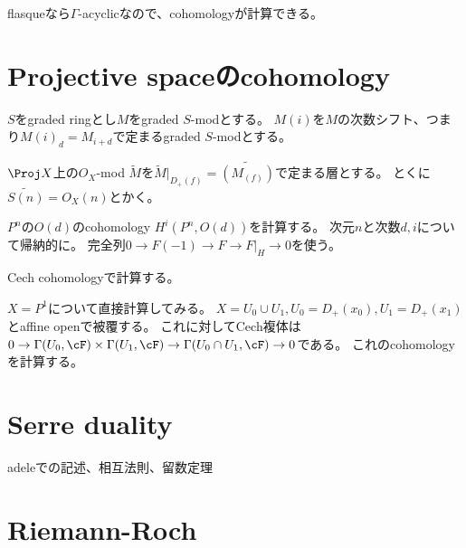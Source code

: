 \documentclass{jsarticle}
\begin{document}
flasqueなら$\Gamma$-acyclicなので、cohomologyが計算できる。

\section{Projective spaceのcohomology}
$S$をgraded ringとし$M$をgraded $S$-modとする。
$M(i)$を$M$の次数シフト、つまり$M(i)_d=M_{i+d}$で定まるgraded $S$-modとする。

$\Proj X$上の$O_X$-mod $\tilde{M}$を$\tilde{M}\vert_{D_+(f)}=\tilde{(M_{(f)})}$で定まる層とする。
とくに$\tilde{S(n)}=O_X(n)$とかく。

$P^n$の$O(d)$のcohomology $H^i(P^n, O(d))$を計算する。
次元$n$と次数$d, i$について帰納的に。
完全列$0 \to F(-1) \to F \to F\vert_H \to 0$を使う。

Cech cohomologyで計算する。

$X=P^1$について直接計算してみる。
$X=U_0 \cup U_1, U_0=D_+(x_0), U_1=D_+(x_1)$とaffine openで被覆する。
これに対してCech複体は$0 \to \Gamma(U_0, \cF) \times \Gamma(U_1, \cF) \to \Gamma(U_0\cap U_1, \cF)\to 0$である。
これのcohomologyを計算する。

\section{Serre duality}
adeleでの記述、相互法則、留数定理

\section{Riemann-Roch}
\end{document}
